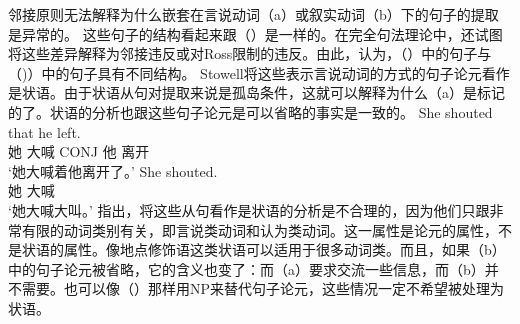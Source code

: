 邻接原则无法解释为什么嵌套在言说动词（a）或叙实动词（b）下的句子的提取是异常的\citep[--69]{EL79a}。
\eal
{}
\zl
这些句子的结构看起来跟（）是一样的。在完全句法理论中，还试图将这些差异解释为邻接违反或对Ross限制的违反。由此，\citep[--402]{Stowell81a-u}认为，（）中的句子与（)）中的句子具有不同结构。
Stowell将这些表示言说动词的方式的句子论元看作是状语。由于状语从句对提取来说是孤岛条件，这就可以解释为什么（a）是标记的了。状语的分析也跟这些句子论元是可以省略的事实是一致的。
\eal
\ex 
\gll She shouted that he left.\\
她 大喊 CONJ 他 离开\\
\glt`她大喊着他离开了。'
\ex 
\gll She shouted.\\
她 大喊\\
\glt `她大喊大叫。'
\zl
\citet[]{AG2008a}指出，将这些从句看作是状语的分析是不合理的，因为他们只跟非常有限的动词类别有关，即言说类动词和认为类动词。这一属性是论元的属性，不是状语的属性。像地点修饰语这类状语可以适用于很多动词类。而且，如果（b）中的句子论元被省略，它的含义也变了：而（a）要求交流一些信息，而（b）并不需要。也可以像（）那样用NP来替代句子论元，这些情况一定不希望被处理为状语。
